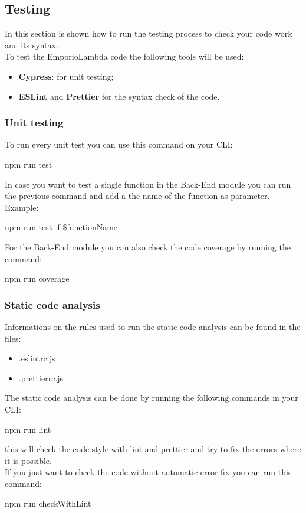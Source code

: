 \subsection{Testing}
In this section is shown how to run the testing process to check your code work and its syntax.\\ 
To test the EmporioLambda code the following tools will be used:
\begin{itemize}
\item \textbf{Cypress}: for unit testing;
\item \textbf{ESLint} and \textbf{Prettier} for the syntax check of the code.
\end{itemize}

\subsubsection{Unit testing}
To run every unit test you can use this command on your CLI:
\begin{center}
npm run test
\end{center}
In case you want to test a single function in the Back-End module you can run the previous command and add a the name of the function as parameter.\\
Example:
\begin{center}
npm run test -f \$functionName
\end{center}
For the Back-End module you can also check the code coverage by running the command:
\begin{center}
npm run coverage
\end{center}

\subsubsection{Static code analysis}
Informations on the rules used to run the static code analysis can be found in the files:
\begin{itemize}
\item .eslintrc.js
\item .prettierrc.js
\end{itemize}
The static code analysis can be done by running the following commands in your CLI:
\begin{center}
npm run lint
\end{center}
this will check the code style with lint and prettier and try to fix the errors where it is possible.\\ 
If you just want to check the code without automatic error fix you can run this command:
\begin{center}
npm run checkWithLint
\end{center}